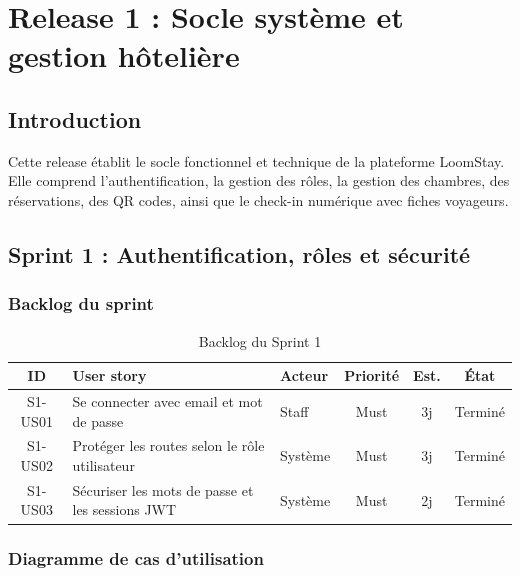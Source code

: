 \chapter{Release 1 : Socle système et gestion hôtelière}
\label{chap:release1}
\section*{Introduction}
Cette release établit le socle fonctionnel et technique de la plateforme LoomStay. Elle comprend l'authentification, la gestion des rôles, la gestion des chambres, des réservations, des QR codes, ainsi que le check-in numérique avec fiches voyageurs.

\section{Sprint 1 : Authentification, rôles et sécurité}
\label{sec:sprint1}

\subsection{Backlog du sprint}
\begin{table}[H]
\centering
\caption{Backlog du Sprint 1}
\small
\begin{tabularx}{\textwidth}{|c|X|p{2.2cm}|c|c|c|}
\hline
\textbf{ID} & \textbf{User story} & \textbf{Acteur} & \textbf{Priorité} & \textbf{Est.} & \textbf{État} \\ \hline
S1-US01 & Se connecter avec email et mot de passe & Staff & Must & 3j & Terminé \\ \hline
S1-US02 & Protéger les routes selon le rôle utilisateur & Système & Must & 3j & Terminé \\ \hline
S1-US03 & Sécuriser les mots de passe et les sessions JWT & Système & Must & 2j & Terminé \\ \hline
\end{tabularx}
\end{table}

\subsection{Diagramme de cas d'utilisation}

